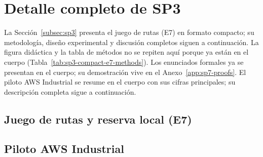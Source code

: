 \section{Detalle completo de SP3}
\label{app:sp3-full-detail}

La Sección~\ref{subsec:sp3} presenta el juego de rutas (E7) en formato
compacto; su metodología, diseño experimental y discusión completos siguen a
continuación. La figura didáctica y la tabla de métodos no se
repiten aquí porque ya están en el cuerpo
(Tabla~\ref{tab:sp3-compact-e7-methods}). Los enunciados formales ya se
presentan en el cuerpo; su demostración vive en el Anexo~\ref{app:sp7-proofs}.
El piloto AWS Industrial se resume en el cuerpo con sus cifras principales; su
descripción completa sigue a continuación.

\subsection{Juego de rutas y reserva local (E7)}
\label{app:sp3-e7-full-detail}


\subsection{Piloto AWS Industrial}
\label{app:sp3-aws-full-detail}

